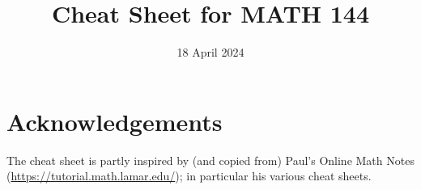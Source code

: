 \documentclass[9pt]{extarticle}
\title{Cheat Sheet for MATH 144}
\date{18 April 2024}
\theoremstyle{definition}
\theoremstyle{remark}
\begin{document}
	
	\pagebreak
	
	\pagebreak
	
	\pagebreak
	

	\section{Acknowledgements}
	The cheat sheet is partly inspired by (and copied from) Paul's Online Math Notes (\url{https://tutorial.math.lamar.edu/}); in particular his various cheat sheets.
\end{document}
